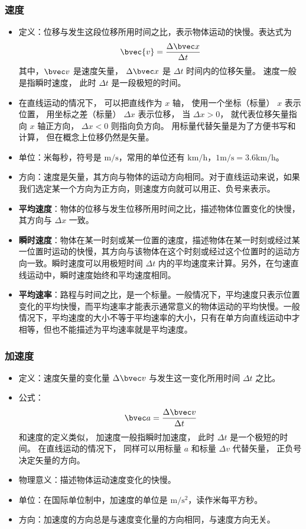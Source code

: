 \subsubsection{速度}
\begin{itemize}
\item 定义：位移与发生这段位移所用时间之比，表示物体运动的快慢。表达式为
\begin{equation}\label{HSPM01_eq3}
\bvec{v} = \frac{\Delta \bvec x}{\Delta t}
\end{equation}
其中，$\bvec v$ 是速度矢量， $\Delta \bvec x$ 是 $\Delta t$ 时间内的位移矢量。 速度一般是指瞬时速度， 此时 $\Delta t$ 是一段极短的时间。
\item 在直线运动的情况下， 可以把直线作为 $x$ 轴， 使用一个坐标（标量） $x$ 表示位置， 用坐标之差（标量） $\Delta x$ 表示位移， 当 $\Delta x > 0$， 就代表位移矢量指向 $x$ 轴正方向， $\Delta x < 0$ 则指向负方向。 用标量代替矢量是为了方便书写和计算， 但在概念上位移仍然是矢量。
\item 单位：米每秒，符号是 $\mathrm{m/s}$，常用的单位还有 $\mathrm{km/h}$，$1\mathrm{m/s}=3.6\mathrm{km/h}$。
\item 方向：速度是矢量，其方向与物体的运动方向相同。对于直线运动来说，如果我们选定某一个方向为正方向，则速度方向就可以用正、负号来表示。
\item \textbf{平均速度}：物体的位移与发生位移所用时间之比，描述物体位置变化的快慢，其方向与 $\Delta x$ 一致。
\item \textbf{瞬时速度}：物体在某一时刻或某一位置的速度，描述物体在某一时刻或经过某一位置时运动的快慢，其方向与该物体在这个时刻或经过这个位置时的运动方向一致。瞬时速度可以用极短时间 $\Delta t$ 内的平均速度来计算。另外，在匀速直线运动中，瞬时速度始终和平均速度相同。
\item \textbf{平均速率}：路程与时间之比，是一个标量。一般情况下，平均速度只表示位置变化的平均快慢，而平均速率才能表示通常意义的物体运动的平均快慢。一般情况下，平均速度的大小不等于平均速率的大小，只有在单方向直线运动中才相等，但也不能描述为平均速率就是平均速度。
\end{itemize}

\subsubsection{加速度}
\begin{itemize}
\item 定义：速度矢量的变化量 $\Delta \bvec v$ 与发生这一变化所用时间 $\Delta t$ 之比。
\item 公式：
\begin{equation}
\bvec a=\frac{\Delta \bvec v}{\Delta t}
\end{equation}
和速度的定义类似， 加速度一般指瞬时加速度， 此时 $\Delta t$ 是一个极短的时间。 在直线运动的情况下， 同样可以用标量 $a$ 和标量 $\Delta v$ 代替矢量， 正负号决定矢量的方向。
\item 物理意义：描述物体运动速度变化的快慢。
\item 单位：在国际单位制中，加速度的单位是 $\mathrm{m/s^2}$，读作米每平方秒。
\item 方向：加速度的方向总是与速度变化量的方向相同，与速度方向无关。
\end{itemize}

